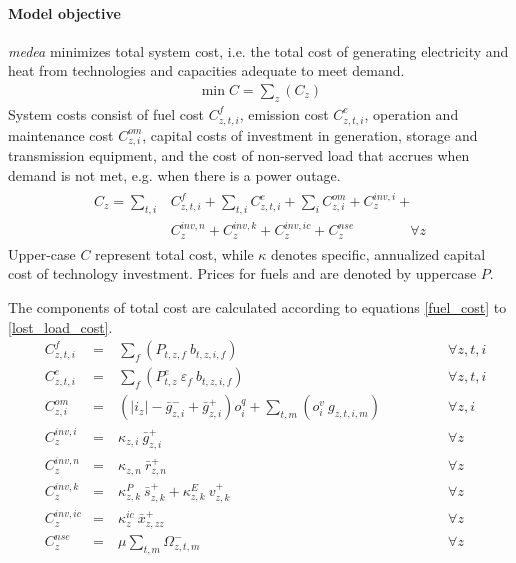 \documentclass[11pt,a4paper]{article}
\begin{document}
\paragraph{Model objective}
\emph{medea} minimizes total system cost, i.e. the total cost of generating electricity and heat from technologies and capacities adequate to meet demand.
\begin{align}
\min C = \sum_{z} (C_{z})
\end{align}
System costs consist of fuel cost $C^{f}_{z,t,i}$, emission cost $C^{e}_{z,t,i}$, operation and maintenance cost $C^{om}_{z,i}$, capital costs of investment in generation, storage and transmission equipment, and the cost of non-served load that accrues when demand is not met, e.g. when there is a power outage.
\begin{align}
\begin{split}
C_{z} = \sum_{t,i} & C^{f}_{z,t,i} + \sum_{t,i} C^{e}_{z,t,i} + \sum_{i} C^{om}_{z,i} + C^{inv,i}_{z} + \\
& C^{inv,n}_{z} + C^{inv,k}_{z} + C^{inv,ic}_{z} + C^{nse}_{z} \qquad \qquad \forall z
\end{split}
\end{align}
Upper-case $C$ represent total cost, while $\kappa$ denotes specific, annualized capital cost of technology investment. Prices for fuels and  are denoted by uppercase $P$.

The components of total cost are calculated according to equations \ref{fuel_cost} to \ref{lost_load_cost}.
\begin{align}
&C^{f}_{z,t,i}& =&\ \sum_{f} \left( P_{t,z,f} \: b_{t,z,i,f} \right) \qquad \qquad &\forall z,t,i \label{fuel_cost} \\
&C^{e}_{z,t,i}& =&\ \sum_{f} \left( P^{e}_{t,z} \: \varepsilon_{f} \: b_{t,z,i,f} \right) \qquad \qquad &\forall z,t,i\\
&C^{om}_{z,i}& =&\ \left(|i_{z}| - \bar{g}^{-}_{z,i} + \bar{g}^{+}_{z,i}\right) o^{q}_{i} + \sum_{t,m} \left(o^{v}_{i} \: g_{z,t,i,m}\right) \qquad \qquad &\forall z,i \\
&C^{inv,i}_{z}& =&\ \kappa_{z,i} \: \bar{g}^{+}_{z,i} \qquad \qquad &\forall z\\
&C^{inv,n}_{z}& =&\ \kappa_{z,n} \: \bar{r}^{+}_{z,n} \qquad \qquad &\forall z\\
&C^{inv,k}_{z}& =&\ \kappa^{P}_{z,k} \: \bar{s}^{+}_{z,k} + \kappa^{E}_{z,k} \: v^{+}_{z,k} \qquad \qquad &\forall z\\
&C^{inv,ic}_{z}& =&\ \kappa^{ic}_{z} \: \bar{x}^{+}_{z,zz} \qquad \qquad &\forall z \label{transmission_expansion_cost}\\
&C^{nse}_{z}& =&\ \mu \sum_{t,m} \Omega^{-}_{z,t,m} \qquad \qquad &\forall z \label{lost_load_cost}
\end{align}
\end{document}
